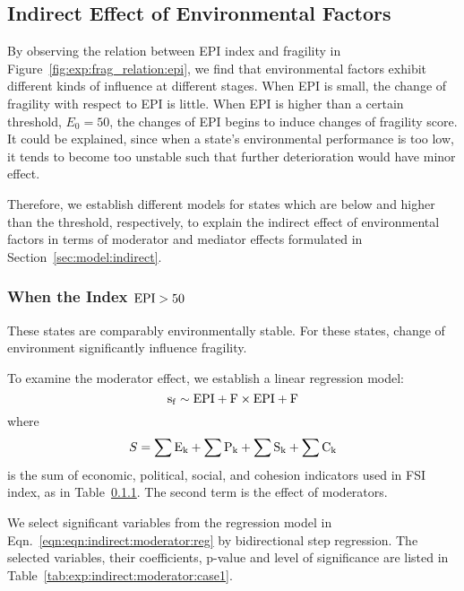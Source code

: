 \subsection{Indirect Effect of Environmental Factors}
By observing the relation between EPI index and fragility in Figure~\ref{fig:exp:frag_relation:epi}, we find that environmental factors exhibit different kinds of influence at different stages. 
When EPI is small, the change of fragility with respect to EPI is little. When EPI is higher than a certain threshold, $E_0=50$, the changes of EPI begins to induce changes of fragility score. It could be explained, since when a state's environmental performance is too low, it tends to become too unstable such that further deterioration would have minor effect.  

Therefore, we establish different models for states which are below and higher than the threshold, respectively, to explain the indirect effect of environmental factors in terms of moderator and mediator effects formulated in Section~\ref{sec:model:indirect}.

\subsubsection{When the Index $\rm{EPI} > 50$}
These states are comparably environmentally stable. For these states, change of environment significantly influence fragility. 

To examine the moderator effect, we establish a linear regression model:
\begin{equation}
    \operatorname*{s_f} \sim \rm{EPI} + F \times\rm{EPI}+ F
    \label{eqn:indirect:moderator:reg} 
\end{equation}
where
\begin{equation}
   S= \sum\rm{E}_k + \sum\rm{P}_k + \sum\rm{S}_k + \sum\rm{C}_k
\end{equation}
is the sum of economic, political, social, and cohesion indicators used in FSI index, as in Table~\ref{}. 
The second term is the effect of moderators. 

We select significant variables from the regression model in Eqn.~\ref{eqn:eqn:indirect:moderator:reg} by bidirectional step regression. The selected variables, their coefficients, p-value and level of significance are listed in Table~\ref{tab:exp:indirect:moderator:case1}.

